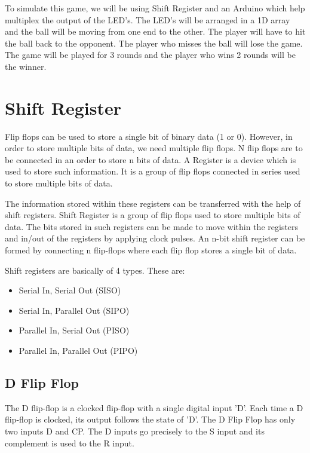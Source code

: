 \documentclass[12pt, a4paper, oneside]{report}
\begin{document}
To simulate this game, we will be using Shift Register and an Arduino which help multiplex the output of the LED's. The LED's will be arranged in a 1D array and the ball will be moving from one end to the other. The player will have to hit the ball back to the opponent. The player who misses the ball will lose the game. The game will be played for 3 rounds and the player who wins 2 rounds will be the winner.

\section{Shift Register}

Flip flops can be used to store a single bit of binary data (1 or 0). However, in order to store multiple bits of data, we need multiple flip flops. N flip flops are to be connected in an order to store n bits of data. A Register is a device which is used to store such information. It is a group of flip flops connected in series used to store multiple bits of data. 

The information stored within these registers can be transferred with the help of shift registers. Shift Register is a group of flip flops used to store multiple bits of data. The bits stored in such registers can be made to move within the registers and in/out of the registers by applying clock pulses. An n-bit shift register can be formed by connecting n flip-flops where each flip flop stores a single bit of data.

Shift registers are basically of 4 types. These are:
\begin{itemize}
    \item Serial In, Serial Out (SISO)
    \item Serial In, Parallel Out (SIPO)
    \item Parallel In, Serial Out (PISO)
    \item Parallel In, Parallel Out (PIPO)
\end{itemize}

\subsection{D Flip Flop}

The D flip-flop is a clocked flip-flop with a single digital input 'D'. Each time a D flip-flop is clocked, its output follows the state of 'D'. The D Flip Flop has only two inputs D and CP. The D inputs go precisely to the S input and its complement is used to the R input.
\end{document}
